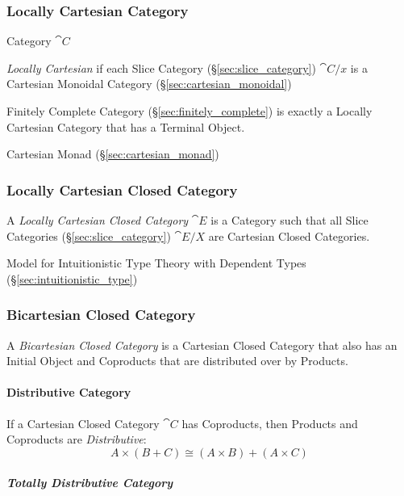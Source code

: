 \subsubsection{Locally Cartesian Category}\label{sec:locally_cartesian}

Category $\cat{C}$

\emph{Locally Cartesian} if each Slice Category
(\S\ref{sec:slice_category}) $\cat{C}/x$ is a Cartesian Monoidal
Category (\S\ref{sec:cartesian_monoidal})

Finitely Complete Category (\S\ref{sec:finitely_complete}) is exactly
a Locally Cartesian Category that has a Terminal Object.

Cartesian Monad (\S\ref{sec:cartesian_monad})



\subsubsection{Locally Cartesian Closed Category}
\label{sec:locally_cartesian_closed}

A \emph{Locally Cartesian Closed Category} $\cat{E}$ is a Category
such that all Slice Categories (\S\ref{sec:slice_category})
$\cat{E}/X$ are Cartesian Closed Categories.

Model for Intuitionistic Type Theory with Dependent Types
(\S\ref{sec:intuitionistic_type})



\subsubsection{Bicartesian Closed Category}\label{sec:bicartesian}

A \emph{Bicartesian Closed Category} is a Cartesian Closed Category
that also has an Initial Object and Coproducts that are distributed
over by Products.



\paragraph{Distributive Category}\label{sec:distributive_category}\hfill

If a Cartesian Closed Category $\cat{C}$ has Coproducts, then
Products and Coproducts are \emph{Distributive}:\cite{awodey06}
\[
  A \times (B + C) \cong (A \times B) + (A \times C)
\]



\subparagraph{Totally Distributive Category}\hfill
\label{sec:totally_distributive_category}



